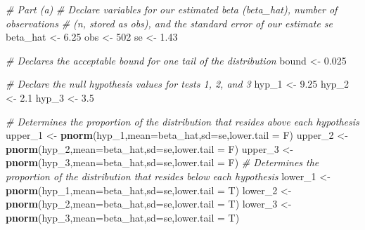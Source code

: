 \documentclass[
]{article}
\newenvironment{Shaded}{\begin{snugshade}}{\end{snugshade}}
\newcommand{\AttributeTok}[1]{\textcolor[rgb]{0.13,0.29,0.53}{#1}}
\newcommand{\CommentTok}[1]{\textcolor[rgb]{0.56,0.35,0.01}{\textit{#1}}}
\newcommand{\DecValTok}[1]{\textcolor[rgb]{0.00,0.00,0.81}{#1}}
\newcommand{\FloatTok}[1]{\textcolor[rgb]{0.00,0.00,0.81}{#1}}
\newcommand{\FunctionTok}[1]{\textcolor[rgb]{0.13,0.29,0.53}{\textbf{#1}}}
\newcommand{\NormalTok}[1]{#1}
\newcommand{\OtherTok}[1]{\textcolor[rgb]{0.56,0.35,0.01}{#1}}
\begin{document}
\begin{Shaded}
\begin{Highlighting}[]
\CommentTok{\# Part (a)}
\CommentTok{\# Declare variables for our estimated beta (\textquotesingle{}beta\_hat\textquotesingle{}), number of observations }
\CommentTok{\# (n, stored as \textquotesingle{}obs\textquotesingle{}), and the standard error of our estimate \textquotesingle{}se\textquotesingle{}}
\NormalTok{beta\_hat }\OtherTok{\textless{}{-}} \FloatTok{6.25}
\NormalTok{obs }\OtherTok{\textless{}{-}} \DecValTok{502}
\NormalTok{se }\OtherTok{\textless{}{-}} \FloatTok{1.43}

\CommentTok{\# Declares the acceptable bound for one tail of the distribution}
\NormalTok{bound }\OtherTok{\textless{}{-}} \FloatTok{0.025}

\CommentTok{\# Declare the null hypothesis values for tests 1, 2, and 3}
\NormalTok{hyp\_1 }\OtherTok{\textless{}{-}} \FloatTok{9.25}
\NormalTok{hyp\_2 }\OtherTok{\textless{}{-}} \FloatTok{2.1}
\NormalTok{hyp\_3 }\OtherTok{\textless{}{-}} \FloatTok{3.5}

\CommentTok{\# Determines the proportion of the distribution that resides above each hypothesis}
\NormalTok{upper\_1 }\OtherTok{\textless{}{-}} \FunctionTok{pnorm}\NormalTok{(hyp\_1,}\AttributeTok{mean=}\NormalTok{beta\_hat,}\AttributeTok{sd=}\NormalTok{se,}\AttributeTok{lower.tail =}\NormalTok{ F)}
\NormalTok{upper\_2 }\OtherTok{\textless{}{-}} \FunctionTok{pnorm}\NormalTok{(hyp\_2,}\AttributeTok{mean=}\NormalTok{beta\_hat,}\AttributeTok{sd=}\NormalTok{se,}\AttributeTok{lower.tail =}\NormalTok{ F)}
\NormalTok{upper\_3 }\OtherTok{\textless{}{-}} \FunctionTok{pnorm}\NormalTok{(hyp\_3,}\AttributeTok{mean=}\NormalTok{beta\_hat,}\AttributeTok{sd=}\NormalTok{se,}\AttributeTok{lower.tail =}\NormalTok{ F)}
\CommentTok{\# Determines the proportion of the distribution that resides below each hypothesis}
\NormalTok{lower\_1 }\OtherTok{\textless{}{-}} \FunctionTok{pnorm}\NormalTok{(hyp\_1,}\AttributeTok{mean=}\NormalTok{beta\_hat,}\AttributeTok{sd=}\NormalTok{se,}\AttributeTok{lower.tail =}\NormalTok{ T)}
\NormalTok{lower\_2 }\OtherTok{\textless{}{-}} \FunctionTok{pnorm}\NormalTok{(hyp\_2,}\AttributeTok{mean=}\NormalTok{beta\_hat,}\AttributeTok{sd=}\NormalTok{se,}\AttributeTok{lower.tail =}\NormalTok{ T)}
\NormalTok{lower\_3 }\OtherTok{\textless{}{-}} \FunctionTok{pnorm}\NormalTok{(hyp\_3,}\AttributeTok{mean=}\NormalTok{beta\_hat,}\AttributeTok{sd=}\NormalTok{se,}\AttributeTok{lower.tail =}\NormalTok{ T)}


\end{Highlighting}
\end{Shaded}
\end{document}
